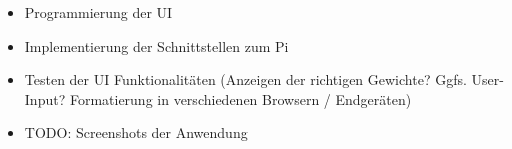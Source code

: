 \begin{itemize}
	\item Programmierung der UI
	\item Implementierung der Schnittstellen zum Pi 
	\item Testen der UI Funktionalit\"aten (Anzeigen der richtigen Gewichte? Ggfs. User-Input? Formatierung in verschiedenen Browsern / Endger\"aten)
	\item TODO: Screenshots der Anwendung
\end{itemize}

%
%
%
%
